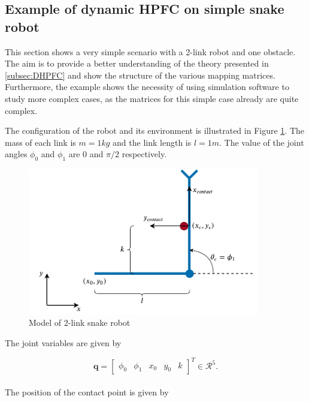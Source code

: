 
\subsection{Example of dynamic HPFC on simple snake robot}

This section shows a very simple scenario with a 2-link robot and one obstacle. The aim is to provide a better understanding of the theory presented in \ref{subsec:DHPFC} and show the structure of the various mapping matrices.
Furthermore, the example shows the necessity of using simulation software to study more complex cases, as the matrices for this simple case already are quite complex.

The configuration of the robot and its environment is illustrated in Figure \ref{fig:ex_2link}. %
The mass of each link is $m = 1 kg$ and the link length is $l=1 m$. The value of the joint angles $\phi_0$ and $\phi_1$ are $0$ and $\pi/2$ respectively.

\begin{figure}
    \centering
    \includegraphics[width=0.9\textwidth]{figures/theory/example_2link.pdf}
    \caption{Model of 2-link snake robot}
    \label{fig:ex_2link}
\end{figure}

The joint variables are given by

\begin{equation}
    \mathbf{q} =
    \begin{bmatrix}
        \phi_0 & \phi_1 & x_0 & y_0 & k
    \end{bmatrix}^T \in \mathcal{R}^5.
\end{equation}
\\
The position of the contact point is given by

